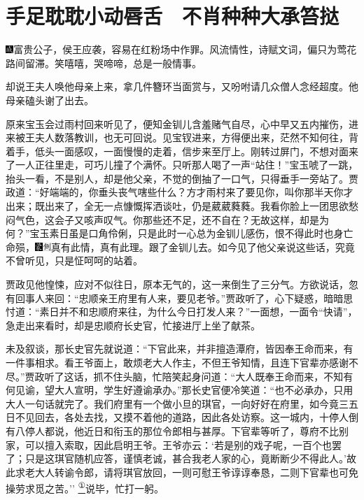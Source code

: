

\chapter{手足耽耽小动唇舌　不肖种种大承笞挞}

{\includegraphics[width=3mm]{../Images/00005}富贵公子，侯王应袭，容易在红粉场中作罪。风流情性，诗赋文词，偏只为莺花路间留滞。笑嘻嘻，哭啼啼，总是一般情事。}

却说王夫人唤他母亲上来，拿几件簪环当面赏与，又吩咐请几众僧人念经超度。他母亲磕头谢了出去。

原来宝玉会过雨村回来听见了，便知金钏儿含羞赌气自尽，心中早又五内摧伤，进来被王夫人数落教训，也无可回说。见宝钗进来，方得便出来，茫然不知何往，背着手，低头一面感叹，一面慢慢的走着，信步来至厅上。刚转过屏门，不想对面来了一人正往里走，可巧儿撞了个满怀。只听那人喝了一声``站住！''宝玉唬了一跳，抬头一看，不是别人，却是他父亲，不觉的倒抽了一口气，只得垂手一旁站了。贾政道：``好端端的，你垂头丧气嗐些什么？方才雨村来了要见你，叫你那半天你才出来；既出来了，全无一点慷慨挥洒谈吐，仍是葳葳蕤蕤。我看你脸上一团思欲愁闷气色，这会子又咳声叹气。你那些还不足，还不自在？无故这样，却是为何？''宝玉素日虽是口角伶俐，只是此时一心总为金钏儿感伤，恨不得此时也身亡命殒，{\includegraphics[width=3mm]{../Images/00006}\includegraphics[width=3mm]{../Images/00011}\footnotesize \kaishu 真有此情，真有此理。}跟了金钏儿去。如今见了他父亲说这些话，究竟不曾听见，只是怔呵呵的站着。

贾政见他惶悚，应对不似往日，原本无气的，这一来倒生了三分气。方欲说话，忽有回事人来回：``忠顺亲王府里有人来，要见老爷。''贾政听了，心下疑惑，暗暗思忖道：``素日并不和忠顺府来往，为什么今日打发人来？''一面想，一面令``快请''，急走出来看时，却是忠顺府长史官，忙接进厅上坐了献茶。

未及叙谈，那长史官先就说道：``下官此来，并非擅造潭府，皆因奉王命而来，有一件事相求。看王爷面上，敢烦老大人作主，不但王爷知情，且连下官辈亦感谢不尽。''贾政听了这话，抓不住头脑，忙陪笑起身问道：``大人既奉王命而来，不知有何见谕，望大人宣明，学生好遵谕承办。''那长史官便冷笑道：``也不必承办，只用大人一句话就完了。我们府里有一个做小旦的琪官，一向好好在府里，如今竟三五日不见回去，各处去找，又摸不着他的道路，因此各处访察。这一城内，十停人倒有八停人都说，他近日和衔玉的那位令郎相与甚厚。下官辈等听了，尊府不比别家，可以擅入索取，因此启明王爷。王爷亦云：`若是别的戏子呢，一百个也罢了；只是这琪官随机应答，谨慎老诚，甚合我老人家的心，竟断断少不得此人。'故此求老大人转谕令郎，请将琪官放回，一则可慰王爷谆谆奉恳，二则下官辈也可免操劳求觅之苦。''{
}\href{../Text/part0037_split_000.html\#lnkback_1_a}{\textsuperscript{①}}说毕，忙打一躬。

